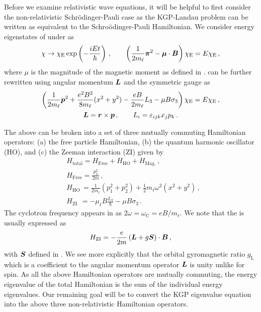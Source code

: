 Before we examine relativistic wave equations, it will be helpful to first consider the non-relativistic Schr{\"o}dinger-Pauli case as the KGP-Landau problem can be written as equivalent to the Schro{\"o}dinger-Pauli Hamiltonian. We consider energy eigenstates of  under  as
\begin{alignat}{1}
	\label{homogeneous:3} \chi\rightarrow\chi_\mathrm{E}\exp\left(-\frac{iEt}{\hbar}\right)\,,\qquad\left(\frac{1}{2m_{\ell}}\boldsymbol{\pi}^{2}-\boldsymbol{\mu}\cdot\boldsymbol{B}\right)\chi_\mathrm{E}=E\chi_\mathrm{E}\,,
\end{alignat}
where $\mu$ is the magnitude of the magnetic moment as defined in .  can be further rewritten using angular momentum $\boldsymbol{L}$ and the symmetric gauge  as
\begin{gather}
	\label{homogeneous:4} \left(\frac{1}{2m_{\ell}}\boldsymbol{p}^{2}+\frac{e^{2}B^{2}}{8m_{\ell}}(x^{2}+y^{2})-\frac{eB}{2m_{\ell}}L_{3}-\mu B\sigma_{3}\right)\chi_\mathrm{E}=E\chi_\mathrm{E}\,,\\
    \boldsymbol{L}=\boldsymbol{r}\times\boldsymbol{p}\,,\qquad L_{i}=\varepsilon_{ijk}x_{j}p_{k}\,.
\end{gather}

The above can be broken into a set of three mutually commuting Hamiltonian operators: (a) the free particle Hamiltonian, (b) the quantum harmonic oscillator (HO), and (c) the Zeeman interaction (ZI) given by
\begin{align}
	\label{homogeneous:7}
    &H_\mathrm{total}=H_\mathrm{Free}+H_\mathrm{HO}+H_\mathrm{Mag.}\,,\\
	\label{homogeneous:7a}
    &H_{\mathrm{Free}}=\frac{p_{3}^{2}}{2m}\,,\\
	\label{homogeneous:7b}
    &H_\mathrm{HO}\,=\frac{1}{2m_{\ell}}\left(p_{1}^{2}+p_{2}^{2}\right) + \frac{1}{2}m_{\ell}\omega^{2}(x^{2}+y^{2})\,,\\
	\label{homogeneous:7c}
    &H_{\mathrm{ZI}}\ \,=-\mu_{\ell}B\frac{L_{3}}{\hbar}-\mu B\sigma_{3}\,.
\end{align}
The cyclotron frequency appears in  as $2\omega=\omega_\mathrm{C}=eB/m_{\ell}$. We note that the  is usually expressed as
\begin{alignat}{1}
	\label{homogeneous:7d}
    H_{\mathrm{ZI}}=-\frac{e}{2m}\left(\boldsymbol{L}+g\boldsymbol{S}\right)\cdot\boldsymbol{B}\,,
\end{alignat}
with $\boldsymbol{S}$ defined in . We see more explicitly that the orbital gyromagnetic ratio $g_\mathrm{L}$ which is a coefficient to the angular momentum operator $\boldsymbol{L}$ is unity unlike for spin. As all the above Hamiltonian operators are mutually commuting, the energy eigenvalue of the total Hamiltonian is the sum of the individual energy eigenvalues. Our remaining goal will be to convert the KGP eigenvalue equation into the above three non-relativistic Hamiltonian operators. 

